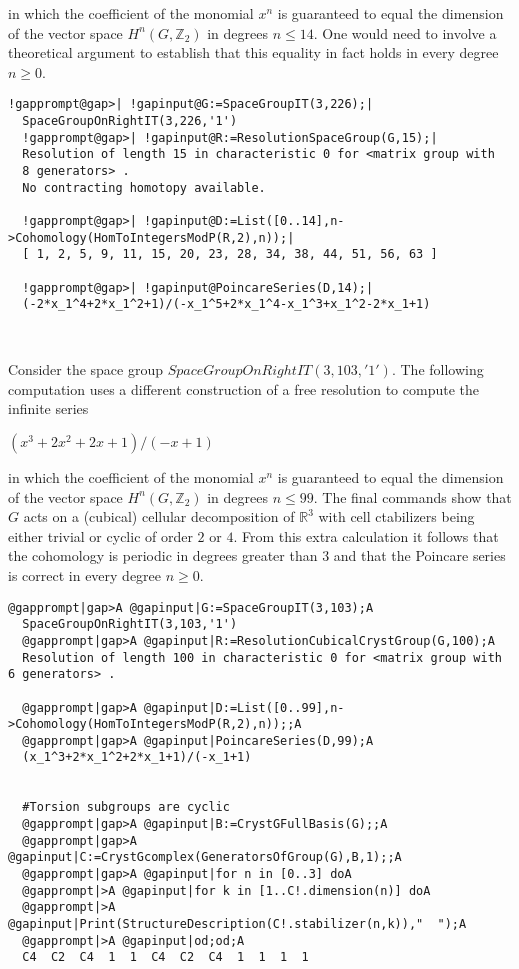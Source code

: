 \documentclass[a4paper,11pt]{report}
\begin{document}
{{{in which the coefficient of the monomial $x^n$ is guaranteed to equal the dimension of the vector space $H^n(G,\mathbb Z_2)$ in degrees $n\le 14$. One would need to involve a theoretical argument to establish that this
equality in fact holds in every degree $n\ge 0$. 
\begin{Verbatim}[commandchars=!@|,fontsize=\small,frame=single,label=Example]
  !gapprompt@gap>| !gapinput@G:=SpaceGroupIT(3,226);|
  SpaceGroupOnRightIT(3,226,'1')
  !gapprompt@gap>| !gapinput@R:=ResolutionSpaceGroup(G,15);|
  Resolution of length 15 in characteristic 0 for <matrix group with 
  8 generators> . 
  No contracting homotopy available. 
  
  !gapprompt@gap>| !gapinput@D:=List([0..14],n->Cohomology(HomToIntegersModP(R,2),n));|
  [ 1, 2, 5, 9, 11, 15, 20, 23, 28, 34, 38, 44, 51, 56, 63 ]
  
  !gapprompt@gap>| !gapinput@PoincareSeries(D,14);|
  (-2*x_1^4+2*x_1^2+1)/(-x_1^5+2*x_1^4-x_1^3+x_1^2-2*x_1+1)
  
  
\end{Verbatim}
 Consider the space group $SpaceGroupOnRightIT(3,103,'1')$. The following computation uses a different construction of a free resolution
to compute the infinite series 

 $ (x^3+2x^2+2x+1)/(-x+1) $ 

in which the coefficient of the monomial $x^n$ is guaranteed to equal the dimension of the vector space $H^n(G,\mathbb Z_2)$ in degrees $n\le 99$. The final commands show that $G$ acts on a (cubical) cellular decomposition of $\mathbb R^3$ with cell ctabilizers being either trivial or cyclic of order $2$ or $4$. From this extra calculation it follows that the cohomology is periodic in
degrees greater than $3$ and that the Poincare series is correct in every degree $n \ge 0$. 
\begin{Verbatim}[commandchars=@|A,fontsize=\small,frame=single,label=Example]
  @gapprompt|gap>A @gapinput|G:=SpaceGroupIT(3,103);A
  SpaceGroupOnRightIT(3,103,'1')
  @gapprompt|gap>A @gapinput|R:=ResolutionCubicalCrystGroup(G,100);A
  Resolution of length 100 in characteristic 0 for <matrix group with 6 generators> . 
  
  @gapprompt|gap>A @gapinput|D:=List([0..99],n->Cohomology(HomToIntegersModP(R,2),n));;A
  @gapprompt|gap>A @gapinput|PoincareSeries(D,99);A
  (x_1^3+2*x_1^2+2*x_1+1)/(-x_1+1)
  
  
  #Torsion subgroups are cyclic
  @gapprompt|gap>A @gapinput|B:=CrystGFullBasis(G);;A
  @gapprompt|gap>A @gapinput|C:=CrystGcomplex(GeneratorsOfGroup(G),B,1);;A
  @gapprompt|gap>A @gapinput|for n in [0..3] doA
  @gapprompt|>A @gapinput|for k in [1..C!.dimension(n)] doA
  @gapprompt|>A @gapinput|Print(StructureDescription(C!.stabilizer(n,k)),"  ");A
  @gapprompt|>A @gapinput|od;od;A
  C4  C2  C4  1  1  C4  C2  C4  1  1  1  1  
  

\end{Verbatim}}}}
\end{document}
